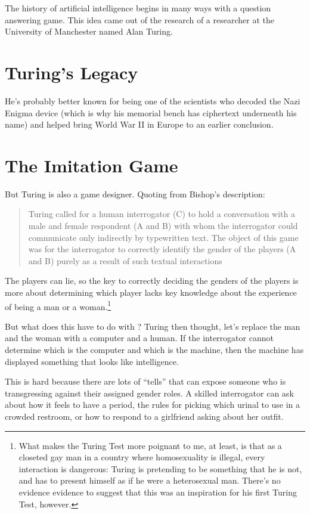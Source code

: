 
The history of artificial intelligence begins in many ways with a
question answering game.  This idea came out of the research of a
researcher at the University of Manchester named Alan Turing.

\section{Turing's Legacy}
\label{sec:turing:legacy}

He’s probably better known for being one of the scientists who decoded
the Nazi Enigma device (which is why his memorial bench has ciphertext
underneath his name) and helped bring World War II in Europe to an
earlier conclusion.


\section{The Imitation Game}
\label{sec:turing:imitation}

But Turing is also a game designer.  Quoting from Bishop’s
description:
\begin{quote}
  Turing called for a human interrogator (C) to hold a conversation
  with a male and female respondent (A and B) with whom the
  interrogator could communicate only indirectly by typewritten text.
  The object of this game was for the interrogator to correctly
  identify the gender of the players (A and B) purely as a result of
  such textual interactions
\end{quote}

The players can lie, so the key to correctly deciding the genders of
the players is more about determining which player lacks key knowledge
about the experience of being a man or a woman.\footnote{What makes
  the Turing Test more poignant to me, at least, is that as a closeted
  gay man in a country where homosexuality is illegal, every
  interaction is dangerous: Turing is pretending to be something that
  he is not, and has to present himself as if he were a heterosexual
  man.  There's no evidence evidence to suggest that this was an
  inspiration for his first Turing Test, however.}

But what does this have to do with ?  Turing then thought,
let’s replace the man and the woman with a computer and a human.  If
the interrogator cannot determine which is the computer and which is
the machine, then the machine has displayed something that looks like
intelligence.

This is hard because there are lots of ``tells'' that can expose
someone who is transgressing against their assigned gender roles.
%
A skilled interrogator can ask about how it feels to have a period,
the rules for picking which urinal to use in a crowded restroom, or
how to respond to a girlfriend asking about her outfit.

